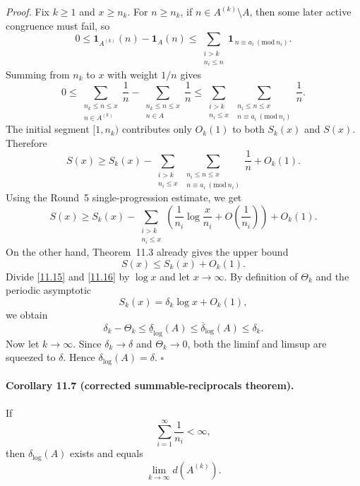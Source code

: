 \emph{Proof.}
Fix $k\ge 1$ and $x\ge n_k$.  For $n\ge n_k$, if $n\in A^{(k)}\setminus A$, then some later active congruence must fail, so
\[
0\le \mathbf 1_{A^{(k)}}(n)-\mathbf 1_A(n)
\le
\sum_{\substack{i>k\\ n_i\le n}}\mathbf 1_{\,n\equiv a_i\ (\mathrm{mod}\ n_i)}.
\]
Summing from $n_k$ to $x$ with weight $1/n$ gives
\begin{equation}
0
\le
\sum_{\substack{n_k\le n\le x\\ n\in A^{(k)}}}\frac1n
-
\sum_{\substack{n_k\le n\le x\\ n\in A}}\frac1n
\le
\sum_{\substack{i>k\\ n_i\le x}}
\sum_{\substack{n_i\le n\le x\\ n\equiv a_i\ (\mathrm{mod}\ n_i)}}\frac1n.
\tag{11.13}
\end{equation}
The initial segment $[1,n_k)$ contributes only $O_k(1)$ to both $S_k(x)$ and $S(x)$.  Therefore
\begin{equation}
S(x)
\ge
S_k(x)
-
\sum_{\substack{i>k\\ n_i\le x}}
\sum_{\substack{n_i\le n\le x\\ n\equiv a_i\ (\mathrm{mod}\ n_i)}}\frac1n
+O_k(1).
\tag{11.14}
\end{equation}
Using the Round~5 single-progression estimate, we get
\begin{equation}
S(x)
\ge
S_k(x)
-
\sum_{\substack{i>k\\ n_i\le x}}
\left(
\frac1{n_i}\log\frac{x}{n_i}+O\!\left(\frac1{n_i}\right)
\right)
+O_k(1).
\tag{11.15}
\end{equation}
On the other hand, Theorem~11.3 already gives the upper bound
\begin{equation}
S(x)\le S_k(x)+O_k(1).
\tag{11.16}
\end{equation}
Divide \eqref{11.15} and \eqref{11.16} by $\log x$ and let $x\to\infty$.  By definition of $\Theta_k$ and the periodic asymptotic
\[
S_k(x)=\delta_k\log x+O_k(1),
\]
we obtain
\begin{equation}
\delta_k-\Theta_k
\le
\underline\delta_{\log}(A)
\le
\overline\delta_{\log}(A)
\le
\delta_k.
\tag{11.17}
\end{equation}
Now let $k\to\infty$.  Since $\delta_k\to \delta$ and $\Theta_k\to 0$, both the liminf and limsup are squeezed to $\delta$.  Hence $\delta_{\log}(A)=\delta$. \hfill $\square$

\paragraph{Corollary 11.7 (corrected summable-reciprocals theorem).}
If
\begin{equation}
\sum_{i=1}^{\infty}\frac1{n_i}<\infty,
\tag{11.18}
\end{equation}
then $\delta_{\log}(A)$ exists and equals
\begin{equation}
\lim_{k\to\infty} d(A^{(k)}).
\tag{11.19}
\end{equation}

